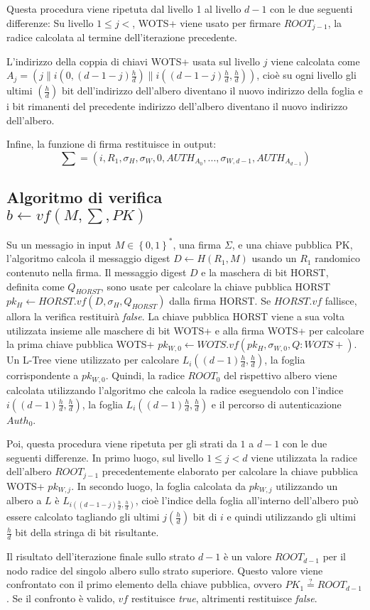 Questa procedura viene ripetuta dal livello 1 al livello \(d - 1\) con le due seguenti differenze: Su livello \( 1 \leqslant j < \), WOTS+ viene usato per firmare \(ROOT_{j-1}\), la radice calcolata al termine dell'iterazione precedente.

L'indirizzo della coppia di chiavi WOTS+ usata sul livello \(j\) viene calcolata come \( A_j = (j\|i(0, (d - 1 - j)\frac{h}{d})\|i((d - 1 - j)\frac{h}{d}, \frac{h}{d})) \), cioè su ogni livello gli ultimi \((\frac{h}{d})\) bit dell'indirizzo dell'albero diventano il nuovo indirizzo della foglia e i bit rimanenti del precedente indirizzo dell'albero diventano il nuovo indirizzo dell'albero.

Infine, la funzione di firma restituisce in output:
\[ \sum = (i, R_1, \sigma_H, \sigma_W,0, AUTH_{A_0} , . . . , \sigma_{W,d-1}, AUTH_{A_{d-1}} ) \]

\subsection{Algoritmo di verifica\\\(b \leftarrow vf(M, \sum, PK)\)}
\label{sec:check_algorithm}
Su un messagio in input \( M \in \left\{0,1\right\}^* \), una firma \(\Sigma\), e una chiave pubblica PK, l'algoritmo calcola il messaggio digest \( D \leftarrow H(R_1,M) \) usando un \(R_1\) randomico contenuto nella firma. Il messaggio digest \(D\) e la maschera di bit HORST, definita come \(Q_{HORST}\), sono usate per calcolare la chiave pubblica HORST \( pk_H \leftarrow HORST.vf(D, \sigma_H, Q_{HORST}) \) dalla firma HORST. Se \(HORST.vf\) fallisce, allora la verifica restituirà \textit{false}. La chiave pubblica HORST viene a sua volta utilizzata insieme alle maschere di bit WOTS+ e alla firma WOTS+ per calcolare la prima chiave pubblica WOTS+ \(pk_{W,0} \leftarrow WOTS.vf(pk_H, \sigma_{W,0}, Q:{WOTS+})\). Un L-Tree viene utilizzato per calcolare \(L_i((d-1)\frac{h}{d},\frac{h}{d})\), la foglia corrispondente a \(pk_{W,0}\). Quindi, la radice \(ROOT_0\) del rispettivo albero viene calcolata utilizzando l'algoritmo che calcola la radice eseguendolo con l'indice \(i((d - 1)\frac{h}{d}, \frac{h}{d})\), la foglia \(L_i((d-1)\frac{h}{d},\frac{h}{d})\) e il percorso di autenticazione \(Auth_0\).

Poi, questa procedura viene ripetuta per gli strati da \(1\) a \(d - 1\) con le due seguenti differenze. In primo luogo, sul livello \(1 \leqslant j < d\) viene utilizzata la radice dell'albero \(ROOT_{j-1}\) precedentemente elaborato per calcolare la chiave pubblica WOTS+ \(pk_{W,j}\). In secondo luogo, la foglia calcolata da \(pk_{W,j}\) utilizzando un albero a \(L\) è \(L_{i((d-1-j)\frac{h}{d},\frac{h}{d})}\), cioè l'indice della foglia all'interno dell'albero può essere calcolato tagliando gli ultimi \(j(\frac{h}{d})\) bit di \(i\) e quindi utilizzando gli ultimi \(\frac{h}{d}\) bit della stringa di bit risultante.

Il risultato dell'iterazione finale sullo strato \(d - 1\) è un valore \(ROOT_{d-1}\) per il nodo radice del singolo albero sullo strato superiore. Questo valore viene confrontato con il primo elemento della chiave pubblica, ovvero \(PK_1 \overset{?}{=} ROOT_{d-1}\). Se il confronto è valido, \(vf\) restituisce \textit{true}, altrimenti restituisce \textit{false}.